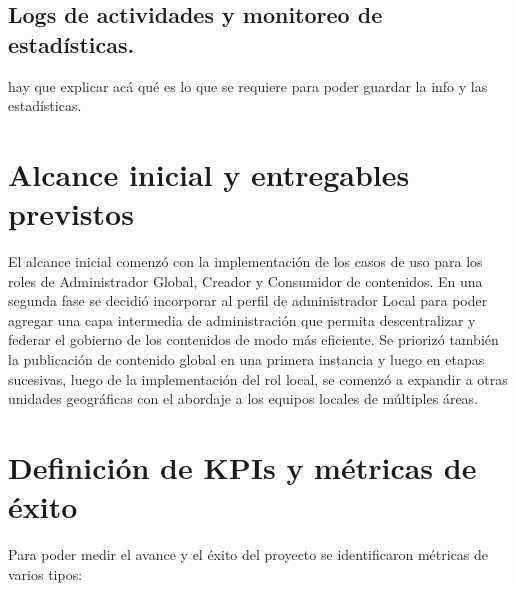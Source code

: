 \subsection{Logs de actividades y monitoreo de estadísticas.}
\label{usecases:logging}
hay que explicar acá qué es lo que se requiere para poder guardar la info y las estadísticas.


\section{Alcance inicial y entregables previstos}
El alcance inicial comenzó con la implementación de los casos de uso para los roles de Administrador Global, Creador y Consumidor de contenidos. En una segunda fase se decidió incorporar al perfil de administrador Local para poder agregar una capa intermedia de administración que permita descentralizar y federar el gobierno de los contenidos de modo más eficiente.
Se priorizó también la publicación de contenido global en una primera instancia y luego en etapas sucesivas, luego de la implementación del rol local, se comenzó a expandir a otras unidades geográficas con el abordaje a los equipos locales de múltiples áreas.

\section{Definición de KPIs y métricas de éxito}

Para poder medir el avance y el éxito del proyecto se identificaron métricas de varios tipos:

